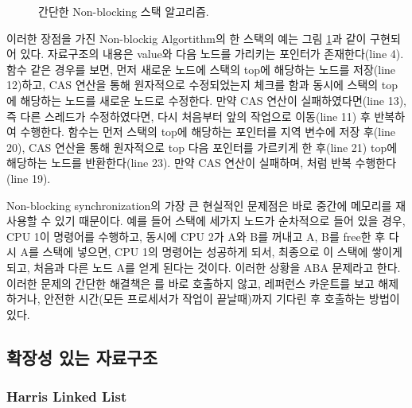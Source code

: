\begin{figure}[h!]
\begin{center}
\inputminted[linenos,fontsize=\footnotesize,
tabsize=4]{c}{src/lockfree_stack.c}
\end{center}
\caption{간단한 Non-blocking 스택 알고리즘.}
\label{fig:nonblockingstack}
\end{figure}


이러한 장점을 가진 Non-blockig Algortithm의 한 스택의 예는 그림 \ref{fig:nonblockingstack}과 같이
구현되어 있다.
자료구조의 내용은 value와 다음 노드를 가리키는 포인터가 존재한다(line 4).
 함수 같은 경우를 보면, 먼저 새로운 노드에 스택의 top에 해당하는 노드를 저장(line 12)하고, 
CAS 연산을 통해 원자적으로 수정되었는지 체크를 함과 동시에 스택의 top에 해당하는 노드를 새로운 노드로 수정한다.
만약 CAS 연산이 실패하였다면(line 13), 즉 다른 스레드가 수정하였다면, 다시 처음부터 앞의 작업으로 
이동(line 11) 후 반복하여 수행한다.
 함수는 먼저 스택의 top에 해당하는 포인터를 지역 변수에 저장 후(line 20), CAS 연산을 통해 
원자적으로 top 다음 포인터를 가르키게 한 후(line 21) top에 해당하는 노드를 반환한다(line 23). 
만약 CAS 연산이 실패하며,  처럼 반복 수행한다(line 19).

Non-blocking synchronization의 가장 큰 현실적인 문제점은 바로 중간에 메모리를 재사용할 수 있기 때문이다.
예를 들어 스택에 세가지 노드가 순차적으로 들어 있을 경우, 
CPU 1이  명령어를 수행하고, 동시에 CPU 2가 A와 B를 꺼내고 A, B를 free한 후 
다시 A를 스택에 넣으면, CPU 1의  명령어는 성공하게 되서, 
최종으로  이 스택에 쌓이게 되고, 처음과 다른 노드 A를 얻게 된다는 것이다.    
이러한 상황을 ABA 문제라고 한다. 
이러한 문제의 간단한 해결책은 를 바로 호출하지 않고, 
레퍼런스 카운트를 보고 해제하거나, 
안전한 시간(모든 프로세서가 작업이 끝날때)까지 기다린 후 호출하는 방법이 있다. 
 

\subsection{확장성 있는 자료구조}

\subsubsection{Harris Linked List}

